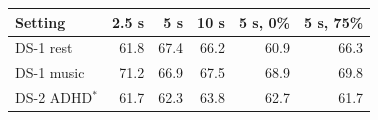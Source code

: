 \small
\begin{tabular}{lrrrrr}
\hline
Setting & 2.5 s & 5 s & 10 s & 5 s, 0\% & 5 s, 75\% \\
\hline
DS-1 rest & 61.8 & 67.4 & 66.2 & 60.9 & 66.3 \\
DS-1 music & 71.2 & 66.9 & 67.5 & 68.9 & 69.8 \\
DS-2 ADHD$^\ast$ & 61.7 & 62.3 & 63.8 & 62.7 & 61.7 \\
\hline
\end{tabular}
